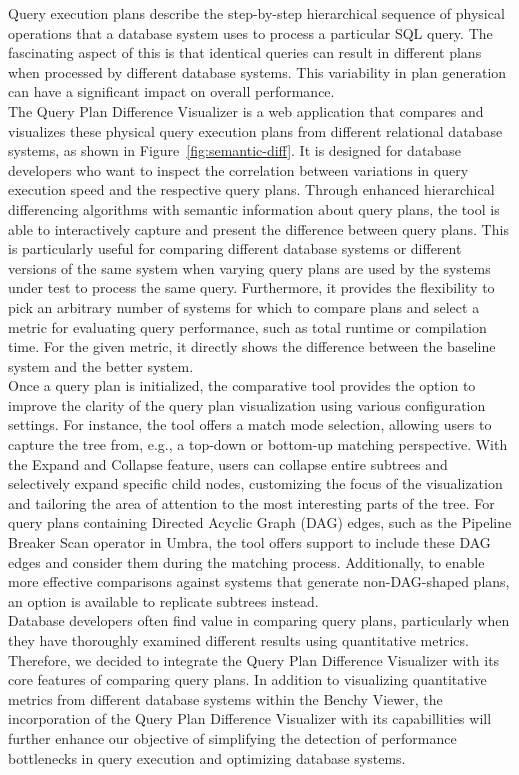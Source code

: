 \noindent 
Query execution plans describe the step-by-step hierarchical sequence of physical operations that a database system uses to process a particular SQL query. The fascinating aspect of this is that identical queries can result in different plans when processed by different database systems. This variability in plan generation can have a significant impact on overall performance.
\\The Query Plan Difference Visualizer is a web application that compares and visualizes these physical query execution plans from different relational database systems, as shown in Figure~\ref{fig:semantic-diff}. It is designed for database developers who want to inspect the correlation between variations in query execution speed and the respective query plans. Through enhanced hierarchical differencing algorithms with semantic information about query plans, the tool is able to interactively capture and present  the difference between query plans. This is particularly useful for comparing different database systems or different versions of the same system when varying query plans are used by the systems under test to process the same query. Furthermore, it provides the flexibility to pick an arbitrary number of systems for which to compare plans and select a metric for evaluating query performance, such as total runtime or compilation time. For the given metric, it directly shows the difference between the baseline system and the better system.
\\ Once a query plan is initialized, the comparative tool provides the option to improve the clarity of the query plan visualization using various configuration settings. For instance, the tool offers a match mode selection, allowing users to capture the tree from, e.g., a top-down or bottom-up matching perspective. With the Expand and Collapse feature, users can collapse entire subtrees and selectively expand specific child nodes, customizing the focus of the visualization and tailoring the area of attention to the most interesting parts of the tree.
For query plans containing Directed Acyclic Graph (DAG) edges, such as the Pipeline Breaker Scan operator in Umbra, the tool offers support to include these DAG edges and consider them during the matching process. Additionally, to enable more effective comparisons against systems that generate non-DAG-shaped plans, an option is available to replicate subtrees instead.
\\ Database developers often find value in comparing query plans, particularly when they have thoroughly examined different results using quantitative metrics. 
Therefore, we decided to integrate the Query Plan Difference Visualizer with its core features of comparing query plans. In addition to visualizing quantitative metrics from different database systems within the Benchy Viewer, the incorporation of the Query Plan Difference Visualizer with its capabillities will further enhance our objective of simplifying the detection of performance bottlenecks in query execution and optimizing database systems.

